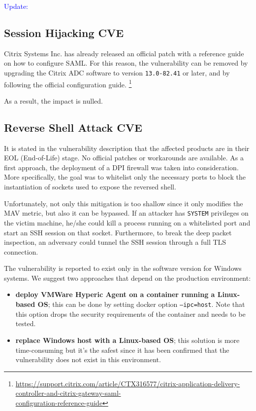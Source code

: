 \noindent \textcolor{blue}{Update:}

\subsection*{Session Hijacking \- CVE}

Citrix Systems Inc. has already released an official patch with a reference guide on how to configure SAML. For this reason, the vulnerability can be removed by upgrading the Citrix ADC software to version \texttt{13.0-82.41} or later, and by following the official configuration guide. \footnote{\href{https://support.citrix.com/article/CTX316577/citrix-application-delivery-controller-and-citrix-gateway-saml-configuration-reference-guide} {https://support.citrix.com/article/CTX316577/citrix-application-delivery-controller-and-citrix-gateway-saml-\\configuration-reference-guide}}

As a result, the impact is nulled.

\subsection*{Reverse Shell Attack \- CVE}

It is stated in the vulnerability description that the affected products are in their EOL (End-of-Life) stage. No official patches or workarounds are available. As a first approach, the deployment of a DPI firewall was taken into consideration. More specifically, the goal was to whitelist only the necessary ports to block the instantiation of sockets used to expose the reversed shell. 

Unfortunately, not only this mitigation is too shallow since it only modifies the MAV metric, but also it can be bypassed. If an attacker has \texttt{SYSTEM} privileges on the victim machine, he/she could kill a process running on a whitelisted port and start an SSH session on that socket. Furthermore, to break the deep packet inspection, an adversary could tunnel the SSH session through a full TLS connection.\cite{online:SSH-TLS}

The vulnerability is reported to exist only in the software version for Windows systems. We suggest two approaches that depend on the production environment:

\begin{itemize}
    \item \textbf{deploy VMWare Hyperic Agent on a container running a Linux-based OS}; this can be done by setting docker option \texttt{--ipc=host}. Note that this option drops the security requirements of the container and needs to be tested.
    \item \textbf{replace Windows host with a Linux-based OS}; this solution is more time-consuming but it's the safest since it has been confirmed that the vulnerability does not exist in this environment.
\end{itemize}

